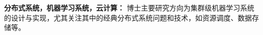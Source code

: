 

\vspace{2mm}
\textbf{分布式系统，机器学习系统，云计算：}
博士主要研究方向为集群级机器学习系统的设计与实现，尤其关注其中的经典分布式系统问题和技术，如资源调度、数据存储等。


\vspace{2mm}